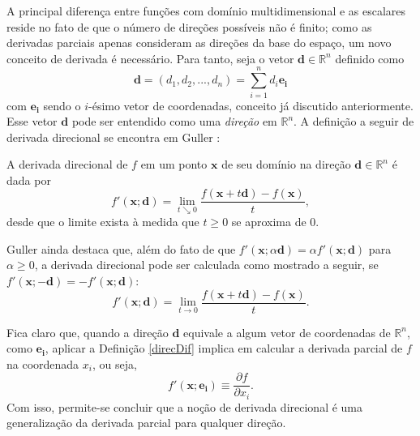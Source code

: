 A principal diferen\c{c}a entre fun\c{c}\~{o}es com dom\'{i}nio multidimensional e as escalares reside no fato de que o n\'{u}mero de dire\c{c}\~{o}es poss\'{i}veis n\~{a}o \'{e} finito; como as derivadas parciais apenas consideram as dire\c{c}\~{o}es da base do espa\c{c}o, um novo conceito de derivada \'{e} necess\'{a}rio. Para tanto, seja o vetor $\mathbf{d} \in \mathbb{R}^{n}$ definido como
\begin{equation*}
\mathbf{d} = (d_1,d_2,...,d_n) = \sum_{i=1}^{n} d_i\mathbf{e_i}
\end{equation*}
com $\mathbf{e_i}$ sendo o $i$-\'{e}simo vetor de coordenadas, conceito j\'{a} discutido anteriormente. Esse vetor $\mathbf{d}$ pode ser entendido como uma \textit{dire\c{c}\~{a}o} em $\mathbb{R}^{n}$. A defini\c{c}\~{a}o a seguir de derivada direcional se encontra em Guller \cite{guller}:
 
\begin{definition}\label{direcDif}
A derivada direcional de $f$ em um ponto $\mathbf{x}$ de seu dom\'{i}nio na dire\c{c}\~{a}o $\mathbf{d} \in \mathbb{R}^{n}$ \'{e} dada por
\begin{equation}
f'(\mathbf{x};\mathbf{d}) = \lim_{t \searrow 0} \frac{f(\mathbf{x}+t\mathbf{d})-f(\mathbf{x})}{t},
\end{equation}
desde que o limite exista \`{a} medida que $t \ge 0$ se aproxima de $0$.
\end{definition}

Guller ainda destaca que, al\'{e}m do fato de que $f'(\mathbf{x};\alpha\mathbf{d}) = \alpha f'(\mathbf{x};\mathbf{d})$ para $\alpha \ge 0$, a derivada direcional pode ser calculada como mostrado a seguir, se $f'(\mathbf{x};-\mathbf{d}) = -f'(\mathbf{x};\mathbf{d})$:
\begin{equation*}
f'(\mathbf{x};\mathbf{d}) = \lim_{t \to 0} \frac{f(\mathbf{x}+t\mathbf{d})-f(\mathbf{x})}{t}.
\end{equation*}

Fica claro que, quando a dire\c{c}\~{a}o $\mathbf{d}$ equivale a algum vetor de coordenadas de $\mathbb{R}^{n}$, como $\mathbf{e_i}$, aplicar a Defini\c{c}\~{a}o \ref{direcDif} implica em calcular a derivada parcial de $f$ na coordenada $x_i$, ou seja,
\begin{equation*}
f'(\mathbf{x};\mathbf{e_i}) \equiv \frac{\partial f}{\partial x_i}.
\end{equation*}
Com isso, permite-se concluir que a no\c{c}\~{a}o de derivada direcional \'{e} uma generaliza\c{c}\~{a}o da derivada parcial para qualquer dire\c{c}\~{a}o.

